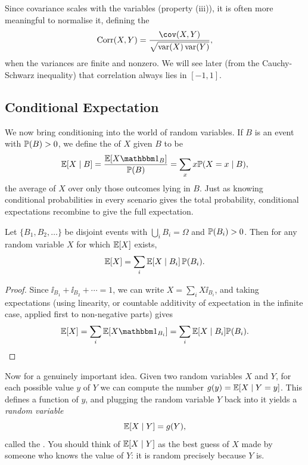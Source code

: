 \documentclass[a4paper]{scrartcl}
\newcommand{\corr}{\operatorname{Corr}}
\begin{document}
Since covariance scales with the variables (property (iii)), it is often more meaningful to normalise it, defining the 
$$
\corr(X, Y) = \frac{\cov(X, Y)}{\sqrt{\var(X)\var(Y)}},
$$
when the variances are finite and nonzero. We will see later (from the Cauchy-Schwarz inequality) that correlation always lies in $[-1, 1]$.

\subsection{Conditional Expectation}

We now bring conditioning into the world of random variables. If $B$ is an event with $\mathbb{P}(B) > 0$, we define the  of $X$ given $B$ to be
$$
\EE[X \mid B] = \frac{\EE[X \ii_B]}{\PP(B)} = \sum_x x \PP(X = x \mid B),
$$
the average of $X$ over only those outcomes lying in $B$. Just as knowing conditional probabilities in every scenario gives the total probability, conditional expectations recombine to give the full expectation.

\begin{theorem}
	Let $\{B_1, B_2, \dots\}$ be disjoint events with $\bigcup_i B_i = \Omega$ and $\mathbb{P}(B_i) > 0$. Then for any random variable $X$ for which $\mathbb{E}[X]$ exists,
	$$
	\mathbb{E}[X] = \sum_i \mathbb{E}[X \mid B_i] \, \mathbb{P}(B_i).
	$$
\end{theorem}
\begin{proof}
	Since $\ii_{B_1} + \ii_{B_2} + \cdots = 1$, we can write $X = \sum_i X\ii_{B_i}$, and taking expectations (using linearity, or countable additivity of expectation in the infinite case, applied first to non-negative parts) gives
	$$
	\EE[X] = \sum_i \EE[X \ii_{B_i}] = \sum_i \EE[X \mid B_i]\PP(B_i). \qedhere
	$$
\end{proof}

Now for a genuinely important idea. Given two random variables $X$ and $Y$, for each possible value $y$ of $Y$ we can compute the number $g(y) = \mathbb{E}[X \mid Y = y]$. This defines a function of $y$, and plugging the random variable $Y$ back into it yields a \emph{random variable}
$$
\mathbb{E}[X \mid Y] = g(Y),
$$
called the . You should think of $\mathbb{E}[X \mid Y]$ as the best guess of $X$ made by someone who knows the value of $Y$: it is random precisely because $Y$ is.
\end{document}
